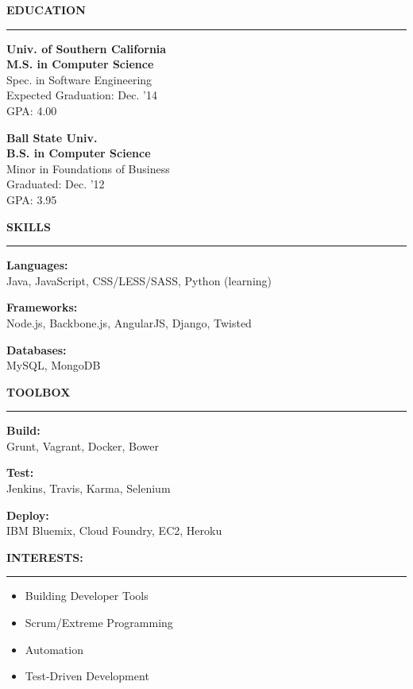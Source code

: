 \documentclass[a4paper,10pt]{article}
\newcommand{\header}[1]
{
\vspace{0.40in}
{\Large \textbf {\uppercase{#1}}}
\vspace{0.05in}
\hrule
\vspace{0.15in}
}
\newcommand{\spacer}{\vspace*{1\baselineskip}}
\newenvironment{details}
{\begin{itemize}[label=\scalebox{.5}{\ding{117}},leftmargin=0.15in]}
{\end{itemize}}
\begin{document}
\begin{minipage}[t]{0.35\textwidth}
\header{Education}

\textbf{Univ. of Southern California\\
M.S. in Computer Science\\}
Spec. in Software Engineering\\
Expected Graduation: Dec. '14\\
GPA: 4.00
\spacer

\textbf{Ball State Univ.\\
B.S. in Computer Science\\}
Minor in Foundations of Business\\
Graduated: Dec. '12\\
GPA: 3.95

\spacer

\header{Skills}

\textbf{Languages:}\\
Java, JavaScript, CSS/LESS/SASS, Python (learning)

\spacer

\textbf{Frameworks:}\\
Node.js, Backbone.js, AngularJS, Django, Twisted

\spacer

\textbf{Databases:}\\
MySQL, MongoDB

\spacer

\header{Toolbox}

\textbf{Build:}\\
Grunt, Vagrant, Docker, Bower

\spacer

\textbf{Test:}\\
Jenkins, Travis, Karma, Selenium

\spacer

\textbf{Deploy:}\\
IBM Bluemix, Cloud Foundry, EC2, Heroku

\spacer\spacer

\header{Interests:}
\begin{details}
  \item Building Developer Tools
  \item Scrum/Extreme Programming
  \item Automation
  \item Test-Driven Development
\end{details}

\end{minipage}
\end{document}

